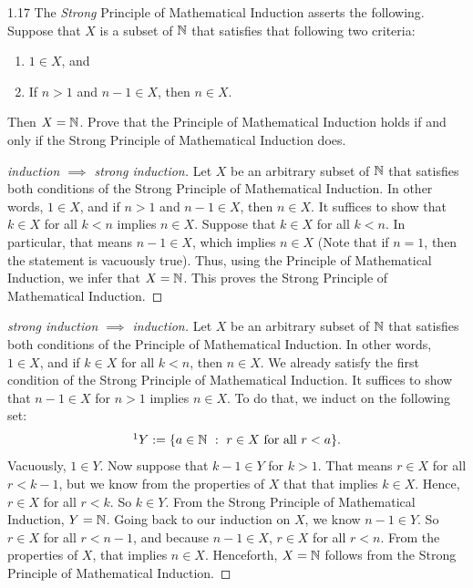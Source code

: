 \newpage
\begin{exercise}{1.17}
    The \textit{Strong} Principle of Mathematical Induction asserts the following. Suppose that
    \(X\) is a subset of \(\mathbb{N}\) that satisfies that following two criteria:
    \begin{enumerate}[label=(\alph*)]
        \item \(1 \in X\), and
        \item If \(n > 1\) and \(n - 1 \in X\), then \(n \in X\).
    \end{enumerate}
    Then \(X = \mathbb{N}\). Prove that the Principle of Mathematical Induction holds if and only if the Strong Principle of Mathematical Induction does.
\end{exercise}
\begin{proof}[induction \(\implies\) strong induction]
    Let \(X\) be an arbitrary subset of \(\mathbb{N}\) that satisfies both conditions of the Strong Principle of Mathematical Induction.
    In other words, \(1 \in X\), and if \(n > 1\) and \(n-1 \in X\), then \(n \in X\). It suffices to show that \(k \in X\) for all \(k < n\) implies \(n \in X\).
    Suppose that \(k \in X\) for all \(k < n\). In particular, that means \(n-1 \in X\), which implies \(n \in X\) (Note that if \(n = 1\), then the statement is vacuously true).
    Thus, using the Principle of Mathematical Induction, we infer that \(X = \mathbb{N}\). This proves the Strong Principle of Mathematical Induction.
\end{proof}
\begin{proof}[strong induction \(\implies\) induction]
    Let \(X\) be an arbitrary subset of \(\mathbb{N}\) that satisfies both conditions of the Principle of Mathematical Induction.
    In other words, \(1 \in X\), and if \(k \in X\) for all \(k < n\), then \(n \in X\). We already satisfy the first condition of the Strong Principle of Mathematical Induction.
    It suffices to show that \(n-1 \in X\) for \(n > 1\) implies \(n \in X\). To do that, we induct on the following set:
    \[\footnotemark Y := \{a \in \naturals\ :\ r\in X \text{ for all }r<a\}.\]
    Vacuously, \(1 \in Y\). Now suppose that \(k-1 \in Y\) for \(k > 1\).
    That means \(r \in X\) for all \(r < k-1\), but we know from the properties of \(X\) that that implies \(k \in X\). Hence, \(r \in X\) for all \(r < k\).
    So \(k \in Y\). From the Strong Principle of Mathematical Induction, \(Y = \mathbb{N}\). Going back to our induction on \(X\), we know \(n-1 \in Y\). So \(r \in X\) for all \(r < n-1\), and
    because \(n-1 \in X\), \(r\in X\) for all \(r < n\). From the properties of \(X\), that implies \(n \in X\). Henceforth, \(X = \mathbb{N}\) follows from the Strong Principle of Mathematical Induction.
\end{proof}
